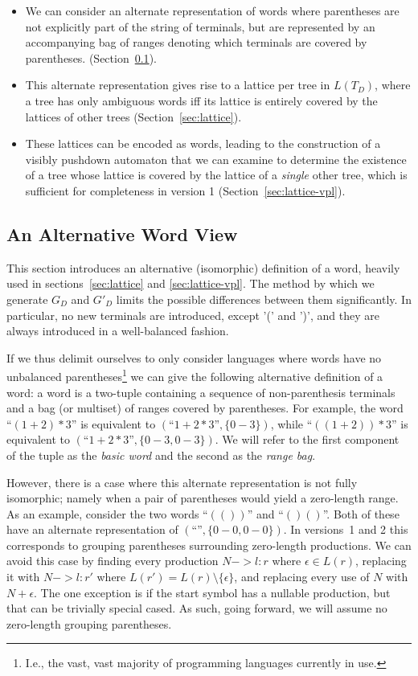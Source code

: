 \documentclass[acmsmall,review,anonymous]{acmart}\settopmatter{printfolios=true,printccs=false,printacmref=false}
\newcommand{\range}[2]{#1\!-\!#2}
\begin{document}
\begin{itemize}
\item We can consider an alternate representation of words where parentheses are not explicitly part of the string of terminals, but are represented by an accompanying bag of ranges denoting which terminals are covered by parentheses. (Section~\ref{sec:word-view}).
\item This alternate representation gives rise to a lattice per tree in $L(T_D)$, where a tree has only ambiguous words iff its lattice is entirely covered by the lattices of other trees (Section~\ref{sec:lattice}).
\item These lattices can be encoded as words, leading to the construction of a visibly pushdown automaton that we can examine to determine the existence of a tree whose lattice is covered by the lattice of a \emph{single} other tree, which is sufficient for completeness in version 1 (Section~\ref{sec:lattice-vpl}).
\end{itemize}

\subsection{An Alternative Word View} \label{sec:word-view}

This section introduces an alternative (isomorphic) definition of a word, heavily used in sections~\ref{sec:lattice} and \ref{sec:lattice-vpl}. The method by which we generate $G_D$ and $G'_D$ limits the possible differences between them significantly. In particular, no new terminals are introduced, except '(' and ')', and they are always introduced in a well-balanced fashion.

If we thus delimit ourselves to only consider languages where words have no unbalanced parentheses\footnote{I.e., the vast, vast majority of programming languages currently in use.} we can give the following alternative definition of a word: a word is a two-tuple containing a sequence of non-parenthesis terminals and a bag (or multiset) of ranges covered by parentheses. For example, the word ``$(1 + 2) * 3$'' is equivalent to $(\text{``}1 + 2 * 3\text{''}, \{\range{0}{3}\})$, while ``$((1 + 2)) * 3$'' is equivalent to $(\text{``}1 + 2 * 3\text{''}, \{\range{0}{3}, \range{0}{3}\})$. We will refer to the first component of the tuple as the \emph{basic word} and the second as the \emph{range bag}.

However, there is a case where this alternate representation is not fully isomorphic; namely when a pair of parentheses would yield a zero-length range. As an example, consider the two words ``$(())$'' and ``$()()$''. Both of these have an alternate representation of $(\text{``}\text{''}, \{\range{0}{0}, \range{0}{0}\})$. In versions~1 and 2 this corresponds to grouping parentheses surrounding zero-length productions. We can avoid this case by finding every production $N -> l : r$ where $\epsilon \in L(r)$, replacing it with $N -> l : r'$ where $L(r') = L(r) \setminus \{\epsilon\}$, and replacing every use of $N$ with $N + \epsilon$. The one exception is if the start symbol has a nullable production, but that can be trivially special cased. As such, going forward, we will assume no zero-length grouping parentheses.
\end{document}
